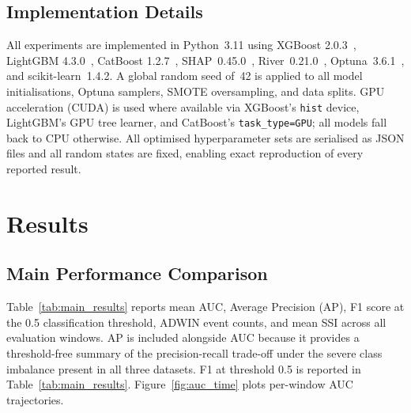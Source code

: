 \documentclass[pdflatex,sn-mathphys-num]{sn-jnl}
\theoremstyle{thmstyleone}
\theoremstyle{thmstyletwo}
\theoremstyle{thmstylethree}
\begin{document}
\subsection{Implementation Details}\label{sec:exp:impl}

All experiments are implemented in Python~3.11 using XGBoost
2.0.3~\cite{chen2016xgboost}, LightGBM 4.3.0~\cite{ke2017lightgbm},
CatBoost 1.2.7~\cite{prokhorenkova2018catboost},
SHAP~0.45.0~\cite{lundberg2020trees}, River~0.21.0~\cite{montiel2021river},
Optuna~3.6.1~\cite{akiba2019optuna}, and scikit-learn~1.4.2. A global random
seed of~42 is applied to all model initialisations, Optuna samplers, SMOTE
oversampling, and data splits. GPU acceleration (CUDA) is used where available
via XGBoost's \texttt{hist} device, LightGBM's GPU tree learner, and
CatBoost's \texttt{task\_type=GPU}; all models fall back to CPU otherwise.
All optimised hyperparameter sets are serialised as JSON files and all random
states are fixed, enabling exact reproduction of every reported result.


\section{Results}\label{sec:results}

\subsection{Main Performance Comparison}\label{sec:res:perf}

Table~\ref{tab:main_results} reports mean AUC, Average Precision (AP), F1
score at the 0.5 classification threshold, ADWIN event counts, and mean SSI
across all evaluation windows. AP is included alongside AUC because it provides
a threshold-free summary of the precision-recall trade-off under the severe
class imbalance present in all three datasets. F1 at threshold 0.5 is reported in Table~\ref{tab:main_results}. Figure~\ref{fig:auc_time} plots per-window AUC trajectories.
\end{document}
